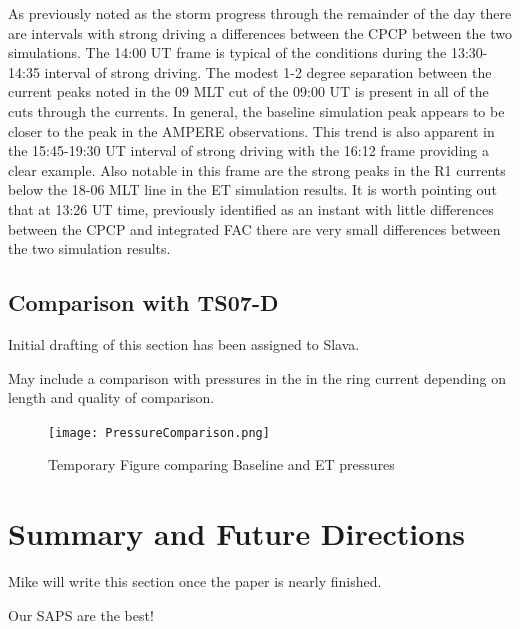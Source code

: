 \documentclass[draft,jgrga]{agutex}
\begin{document}
\begin{article}
As previously noted as the storm progress through the remainder of the day there are intervals with strong driving a differences between the CPCP between the two simulations.  The 14:00 UT frame is typical of the conditions during the 13:30-14:35 interval of strong driving.  The modest 1-2 degree separation between the current peaks noted in the 09 MLT cut of the 09:00 UT is present in all of the cuts through the currents.  In general, the baseline simulation peak appears to be closer to the peak in the AMPERE observations.  This trend is also apparent in the 15:45-19:30 UT interval of strong driving with the 16:12 frame providing a clear example.  Also notable in this frame are the strong peaks in the R1 currents below the 18-06 MLT line in the ET simulation results.  It is worth pointing out that at 13:26 UT time, previously identified as an instant with little differences between the CPCP and integrated FAC there are very small differences between the two simulation results. 


 \subsection{Comparison with TS07-D}
 \label{sec-ts07d}
 Initial drafting of this section has been assigned to Slava.
 
 
 May include a comparison with pressures in the in the ring current depending on length and quality of comparison.
 
\begin{figure}[t]
\noindent\texttt{[image: PressureComparison.png]}
\caption{\label{press-fig}
Temporary Figure comparing Baseline and ET pressures}
\end{figure}


 \section{Summary and Future Directions}
\label{sec-future}

Mike will write this section once the paper is nearly finished.

Our SAPS are the best!




\end{article}
\end{document}

